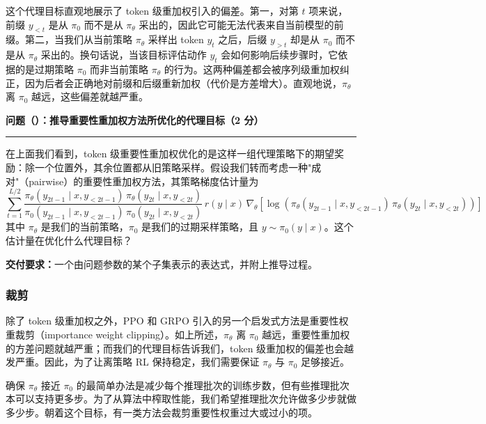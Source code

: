 这个代理目标直观地展示了 token 级重加权引入的偏差。第一，对第 $t$ 项来说，前缀 $y_{<t}$ 是从 $\pi_0$ 而不是从 $\pi_\theta$ 采出的，因此它可能无法代表来自当前模型的前缀。第二，当我们从当前策略 $\pi_\theta$ 采样出 token $y_t$ 之后，后缀 $y_{>t}$ 却是从 $\pi_0$ 而不是从 $\pi_\theta$ 采出的。换句话说，当该目标评估动作 $y_t$ 会如何影响后续步骤时，它依据的是过期策略 $\pi_0$ 而非当前策略 $\pi_\theta$ 的行为。这两种偏差都会被序列级重加权纠正，因为后者会正确地对前缀和后缀重新加权（代价是方差增大）。直观地说，$\pi_\theta$ 离 $\pi_0$ 越远，这些偏差就越严重。

\medskip
\noindent\textbf{问题（）：推导重要性重加权方法所优化的代理目标（2 分）}
\par\nobreak\smallskip\hrule\nobreak\medskip

在上面我们看到，token 级重要性重加权优化的是这样一组代理策略下的期望奖励：除一个位置外，其余位置都从旧策略采样。假设我们转而考虑一种"成对"（pairwise）的重要性重加权方法，其策略梯度估计量为
\begin{equation}
\sum_{t=1}^{L/2} \frac{\pi_\theta(y_{2t-1} \mid x, y_{<2t-1})\,\pi_\theta(y_{2t} \mid x, y_{<2t})}{\pi_0(y_{2t-1} \mid x, y_{<2t-1})\,\pi_0(y_{2t} \mid x, y_{<2t})}\, r(y \mid x)\,\nabla_\theta\!\left[\log\!\left(\pi_\theta(y_{2t-1} \mid x, y_{<2t-1})\,\pi_\theta(y_{2t} \mid x, y_{<2t})\right)\right]
\end{equation}
其中 $\pi_\theta$ 是我们的当前策略，$\pi_0$ 是我们的过期采样策略，且 $y \sim \pi_0(y \mid x)$。这个估计量在优化什么代理目标？

\textbf{交付要求：}一个由问题参数的某个子集表示的表达式，并附上推导过程。

\subsubsection{裁剪}

除了 token 级重加权之外，PPO 和 GRPO 引入的另一个启发式方法是重要性权重裁剪（importance weight clipping）。如上所述，$\pi_\theta$ 离 $\pi_0$ 越远，重要性重加权的方差问题就越严重；而我们的代理目标告诉我们，token 级重加权的偏差也会越发严重。因此，为了让离策略 RL 保持稳定，我们需要保证 $\pi_\theta$ 与 $\pi_0$ 足够接近。

确保 $\pi_\theta$ 接近 $\pi_0$ 的最简单办法是减少每个推理批次的训练步数，但有些推理批次本可以支持更多步。为了从算法中榨取性能，我们希望推理批次允许做多少步就做多少步。朝着这个目标，有一类方法会裁剪重要性权重过大或过小的项。

